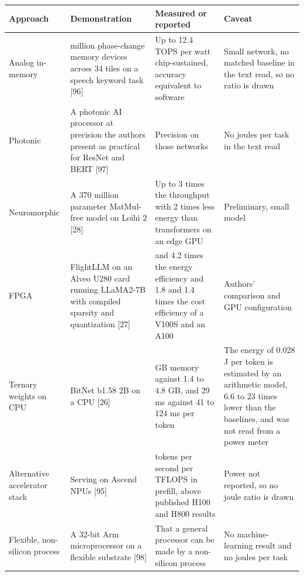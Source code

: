 \documentclass[10pt,letterpaper]{article}
\newcounter{none}
\begin{document}
{\def\LTcaptype{none} %
{\footnotesize\setlength{\tabcolsep}{3.8pt}\renewcommand{\arraystretch}{1.15}
\begin{longtable}[]{@{}
  >{\raggedright\arraybackslash}p{}
  >{\raggedright\arraybackslash}p{}
  >{\raggedright\arraybackslash}p{}
  >{\raggedright\arraybackslash}p{}@{}}
\toprule\noalign{}
\begin{minipage}[b]{\linewidth}\raggedright
\textbf{Approach}
\end{minipage} & \begin{minipage}[b]{\linewidth}\raggedright
\textbf{Demonstration}
\end{minipage} & \begin{minipage}[b]{\linewidth}\raggedright
\textbf{Measured or reported}
\end{minipage} & \begin{minipage}[b]{\linewidth}\raggedright
\textbf{Caveat}
\end{minipage} \\
\midrule\noalign{}
\endhead
\bottomrule\noalign{}
\endlastfoot
Analog in-memory & 35 million phase-change memory devices across 34
tiles on a speech keyword task {[}96{]} & Up to 12.4 TOPS per watt
chip-sustained, accuracy equivalent to software & Small network, no
matched baseline in the text read, so no ratio is drawn \\
Photonic & A photonic AI processor at precision the authors present as
practical for ResNet and BERT {[}97{]} & Precision on those networks &
No joules per task in the text read \\
Neuromorphic & A 370 million parameter MatMul-free model on Loihi 2
{[}28{]} & Up to 3 times the throughput with 2 times less energy than
transformers on an edge GPU & Preliminary, small model \\
FPGA & FlightLLM on an Alveo U280 card running LLaMA2-7B with compiled
sparsity and quantization {[}27{]} & 6.0 and 4.2 times the energy
efficiency and 1.8 and 1.4 times the cost efficiency of a V100S and an
A100 & Authors' comparison and GPU configuration \\
Ternary weights on CPU & BitNet b1.58 2B on a CPU {[}26{]} & 0.4 GB
memory against 1.4 to 4.8 GB, and 29 ms against 41 to 124 ms per token &
The energy of 0.028 J per token is estimated by an arithmetic model, 6.6
to 23 times lower than the baselines, and was not read from a power
meter \\
Alternative accelerator stack & Serving on Ascend NPUs {[}95{]} & 4.45
tokens per second per TFLOPS in prefill, above published H100 and H800
results & Power not reported, so no joule ratio is drawn \\
Flexible, non-silicon process & A 32-bit Arm microprocessor on a
flexible substrate {[}98{]} & That a general processor can be made by a
non-silicon process & No machine-learning result and no joules per
task \\
\end{longtable}
}
}
\end{document}
